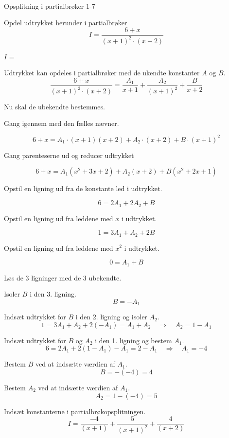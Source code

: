 \documentclass{article}
\begin{document}
\begin{exercise}{Opsplitning i partialbrøker 1-7}
	
	Opdel udtrykket herunder i partialbrøker
	\[
	I = \frac{6 + x}{(x + 1)^2 \cdot (x + 2)}
	\]
	
	$I$ =  
	
	\hint
	Udtrykket kan opdeles i partialbrøker med de ukendte konstanter $A$ og $B$.
	\[
	\frac{6 + x}{(x + 1)^2 \cdot (x + 2)} = 
	\frac{A_1}{x + 1} + \frac{A_2}{(x+1)^2} + \frac{B}{x + 2}
	\]
	
	\hint
	Nu skal de ubekendte bestemmes.
	
	\hint
	Gang igennem med den fælles nævner.
	
	\hint
	\[
	6 + x = A_1 \cdot (x + 1)(x+2) + A_2 \cdot (x+2)  + B \cdot (x + 1)^2
	\]
	
	\hint
	Gang parenteserne ud og reducer udtrykket
	
	\hint
	\[
	6 + x = A_1(x^2 + 3x + 2) + A_2(x+2) + B(x^2 + 2x + 1)
	\]
	
	\hint
	Opstil en ligning ud fra de konstante led i udtrykket.
	
	\hint
	\[
	6 = 2A_1 + 2A_2 + B
	\]
	
	\hint
	Opstil en ligning ud fra leddene med $x$ i udtrykket.
	
	\hint
	\[
	1 = 3A_1 + A_2 + 2B
	\]
		
	\hint
	Opstil en ligning ud fra leddene med $x^2$ i udtrykket.
	
	\hint
	\[
	0 = A_1 + B
	\]
	
	\hint
	Løs de 3 ligninger med de 3 ubekendte.
	
	\hint
	Isoler $B$ i den 3. ligning.
	\[
	B  =  -A_1
	\]
	
	\hint
	Indsæt udtrykket for $B$ i den 2. ligning og isoler $A_2$.
	\[
	1 = 3A_1 + A_2 + 2(-A_1) = A_1 + A_2 \quad	\Rightarrow 	\quad A_2 = 1 - A_1
	\]
	
	\hint
	Indsæt udtrykket for $B$ og $A_2$ i den 1. ligning og bestem $A_1$.
	\[
	6 = 2 A_1 + 2(1-A_1) -A_1 = 2 - A_1		\quad 	\Rightarrow 		\quad A_1 = -4
	 \]
	
	\hint
	Bestem $B$ ved at indsætte værdien af $A_1$.
	\[
	B = - (-4) = 4 
	\]
	
	\hint
	Bestem $A_2$ ved at indsætte værdien af $A_1$.
	\[
	A_2 = 1 - (-4) = 5
	\]
	
	\hint
	Indsæt konstanterne i partialbrøkopsplitningen.
	\[
	I = \frac{-4}{(x+1)} + \frac{5}{(x+1)^2} + \frac{4}{(x+2)}
	\]
	
	
	
\end{exercise}
\end{document}
